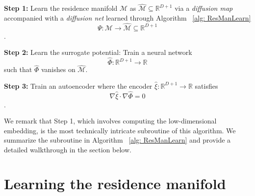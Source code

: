 \documentclass[reqno, 12pt]{article}
\begin{document}
\begin{algorithm*}
\label{alg: learning cv}
     \caption{Learning CV that satisfies the orthogonality condition \eqref{eq: orthogonality condition}}
     
     \textbf{Step 1: } Learn the residence manifold $\mathcal{M}$ as $\widehat{\mathcal{M}} \subseteq \mathbb{R}^{D+1}$ via a \emph{diffusion map} \cite{coifman2006diffusion} accompanied with a \emph{diffusion net} \cite{mishne2019diffusion} learned through Algorithm ~\ref{alg: ResManLearn} $$\Psi: \mathcal{M} \to \widehat{\mathcal{M}} \subseteq \mathbb{R}^{D+1}$$. 
     
     \textbf{Step 2: } Learn the surrogate potential: Train a neural network $$\widehat{\Phi}: \mathbb{R}^{D+1} \to \mathbb{R}$$ such that $\widehat{\Phi}$ vanishes on $\widehat{\mathcal{M}}$. 
     
     \textbf{Step 3: } Train an autoencoder where the encoder $\widehat{\xi}: \mathbb{R}^{D+1} \to \mathbb{R}$ satisfies $$\nabla \widehat{\xi} \cdot \nabla \widehat{\Phi} = 0$$. 
     
\end{algorithm*}

We remark that Step 1, which involves computing the low-dimensional embedding, is the most technically intricate subroutine of this algorithm. We summarize the subroutine in Algorithm ~\ref{alg: ResManLearn} and provide a detailed walkthrough in the section below. 


\section{Learning the residence manifold} 
\label{sec: resmanlearn}
\end{document}
